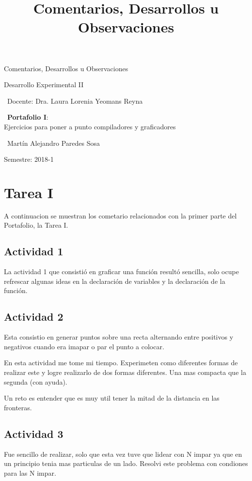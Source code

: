 \documentclass[12pt,letterpaper]{article}
\title{ Comentarios, Desarrollos u Observaciones  }
\begin{document}
\begin{titlepage}
	\centering
    \vspace*{2cm}
	{\Huge Comentarios, Desarrollos u Observaciones \par}
	\vfill
	{\Large Desarrollo Experimental II \par}
	\vfill
	{\large\ Docente: Dra. Laura Lorenia Yeomans Reyna \par}
    \vfill
    {\large\ \textbf{Portafolio I}:\\ Ejercicios para poner a punto compiladores y graficadores \par}
    \vfill
    {\large\ Martín Alejandro Paredes Sosa \par}
	\vfill
	{\large Semestre: 2018-1\par}
\end{titlepage}
\section{Tarea I}
A continuacion se muestran  los cometario relacionados con la primer parte del Portafolio, la Tarea I.
\vspace{-0.5cm}

\subsection*{Actividad 1}
La actividad 1 que consistió en graficar una función resultó sencilla, solo ocupe refrescar algunas ideas en la declaración de variables y la declaración de la función.

\subsection*{Actividad 2}
Esta consistio en generar puntos sobre una recta alternando entre positivos y negativos cuando era imapar o par el punto a colocar.

En esta actividad me tome mi tiempo. Experimeten como diferentes formas de realizar este y logre realizarlo de dos formas diferentes. Una mas compacta que la segunda (con ayuda).

Un reto es entender que es muy util tener la mitad de la distancia en las fronteras.

\subsection*{Actividad 3}
Fue sencillo de realizar, solo que esta vez tuve que lidear con N impar ya que en un principio tenia mas particulas de un lado. Resolvi este problema con condiones para las N impar.
\end{document}
